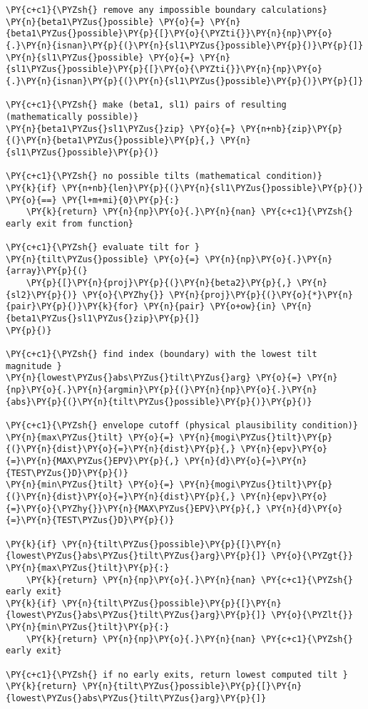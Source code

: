 \begin{tcolorbox}[breakable, size=fbox, boxrule=1pt, pad at break*=1mm,colback=cellbackground, colframe=cellborder]
\begin{Verbatim}[commandchars=\\\{\}]
\PY{c+c1}{\PYZsh{} remove any impossible boundary calculations}
\PY{n}{beta1\PYZus{}possible} \PY{o}{=} \PY{n}{beta1\PYZus{}possible}\PY{p}{[}\PY{o}{\PYZti{}}\PY{n}{np}\PY{o}{.}\PY{n}{isnan}\PY{p}{(}\PY{n}{sl1\PYZus{}possible}\PY{p}{)}\PY{p}{]}
\PY{n}{sl1\PYZus{}possible} \PY{o}{=} \PY{n}{sl1\PYZus{}possible}\PY{p}{[}\PY{o}{\PYZti{}}\PY{n}{np}\PY{o}{.}\PY{n}{isnan}\PY{p}{(}\PY{n}{sl1\PYZus{}possible}\PY{p}{)}\PY{p}{]}

\PY{c+c1}{\PYZsh{} make (beta1, sl1) pairs of resulting (mathematically possible)}
\PY{n}{beta1\PYZus{}sl1\PYZus{}zip} \PY{o}{=} \PY{n+nb}{zip}\PY{p}{(}\PY{n}{beta1\PYZus{}possible}\PY{p}{,} \PY{n}{sl1\PYZus{}possible}\PY{p}{)}

\PY{c+c1}{\PYZsh{} no possible tilts (mathematical condition)}
\PY{k}{if} \PY{n+nb}{len}\PY{p}{(}\PY{n}{sl1\PYZus{}possible}\PY{p}{)} \PY{o}{==} \PY{l+m+mi}{0}\PY{p}{:}
    \PY{k}{return} \PY{n}{np}\PY{o}{.}\PY{n}{nan} \PY{c+c1}{\PYZsh{} early exit from function}

\PY{c+c1}{\PYZsh{} evaluate tilt for }
\PY{n}{tilt\PYZus{}possible} \PY{o}{=} \PY{n}{np}\PY{o}{.}\PY{n}{array}\PY{p}{(}
    \PY{p}{[}\PY{n}{proj}\PY{p}{(}\PY{n}{beta2}\PY{p}{,} \PY{n}{sl2}\PY{p}{)} \PY{o}{\PYZhy{}} \PY{n}{proj}\PY{p}{(}\PY{o}{*}\PY{n}{pair}\PY{p}{)}\PY{k}{for} \PY{n}{pair} \PY{o+ow}{in} \PY{n}{beta1\PYZus{}sl1\PYZus{}zip}\PY{p}{]}
\PY{p}{)}

\PY{c+c1}{\PYZsh{} find index (boundary) with the lowest tilt magnitude }
\PY{n}{lowest\PYZus{}abs\PYZus{}tilt\PYZus{}arg} \PY{o}{=} \PY{n}{np}\PY{o}{.}\PY{n}{argmin}\PY{p}{(}\PY{n}{np}\PY{o}{.}\PY{n}{abs}\PY{p}{(}\PY{n}{tilt\PYZus{}possible}\PY{p}{)}\PY{p}{)}

\PY{c+c1}{\PYZsh{} envelope cutoff (physical plausibility condition)}
\PY{n}{max\PYZus{}tilt} \PY{o}{=} \PY{n}{mogi\PYZus{}tilt}\PY{p}{(}\PY{n}{dist}\PY{o}{=}\PY{n}{dist}\PY{p}{,} \PY{n}{epv}\PY{o}{=}\PY{n}{MAX\PYZus{}EPV}\PY{p}{,} \PY{n}{d}\PY{o}{=}\PY{n}{TEST\PYZus{}D}\PY{p}{)}
\PY{n}{min\PYZus{}tilt} \PY{o}{=} \PY{n}{mogi\PYZus{}tilt}\PY{p}{(}\PY{n}{dist}\PY{o}{=}\PY{n}{dist}\PY{p}{,} \PY{n}{epv}\PY{o}{=}\PY{o}{\PYZhy{}}\PY{n}{MAX\PYZus{}EPV}\PY{p}{,} \PY{n}{d}\PY{o}{=}\PY{n}{TEST\PYZus{}D}\PY{p}{)}

\PY{k}{if} \PY{n}{tilt\PYZus{}possible}\PY{p}{[}\PY{n}{lowest\PYZus{}abs\PYZus{}tilt\PYZus{}arg}\PY{p}{]} \PY{o}{\PYZgt{}} \PY{n}{max\PYZus{}tilt}\PY{p}{:}
    \PY{k}{return} \PY{n}{np}\PY{o}{.}\PY{n}{nan} \PY{c+c1}{\PYZsh{} early exit}
\PY{k}{if} \PY{n}{tilt\PYZus{}possible}\PY{p}{[}\PY{n}{lowest\PYZus{}abs\PYZus{}tilt\PYZus{}arg}\PY{p}{]} \PY{o}{\PYZlt{}} \PY{n}{min\PYZus{}tilt}\PY{p}{:}
    \PY{k}{return} \PY{n}{np}\PY{o}{.}\PY{n}{nan} \PY{c+c1}{\PYZsh{} early exit}

\PY{c+c1}{\PYZsh{} if no early exits, return lowest computed tilt }
\PY{k}{return} \PY{n}{tilt\PYZus{}possible}\PY{p}{[}\PY{n}{lowest\PYZus{}abs\PYZus{}tilt\PYZus{}arg}\PY{p}{]}
\end{Verbatim}
\end{tcolorbox}

